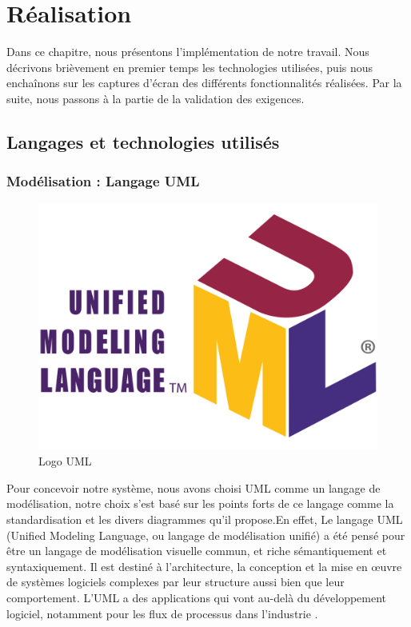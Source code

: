 \chapter{Réalisation}
\label{chap:Réalisation}


Dans ce chapitre, nous présentons l’implémentation de notre travail. Nous décrivons brièvement en premier temps les technologies utilisées, puis nous enchaînons sur les captures d’écran des différents fonctionnalités réalisées. Par la suite, nous passons à la partie de la validation des exigences.
\pagebreak
\section{Langages et technologies utilisés}


\subsection{Modélisation : Langage UML}

\begin{figure}[H]
    \centering
    \includegraphics[scale=0.15]{Logos/UML_logo.png}
    \caption{Logo UML}
\end{figure}

Pour concevoir notre système, nous avons choisi UML comme un
langage de modélisation, notre choix s’est basé sur les points forts de
ce langage comme la standardisation et les divers diagrammes qu’il
propose.En effet, Le langage UML (Unified Modeling Language, ou langage de modélisation unifié) a été pensé pour être un langage de modélisation visuelle commun, et riche sémantiquement et syntaxiquement. Il est destiné à l'architecture, la conception et la mise en œuvre de systèmes logiciels complexes par leur structure aussi bien que leur comportement. L'UML a des applications qui vont au-delà du développement logiciel, notamment pour les flux de processus dans l'industrie \cite{UML}.

